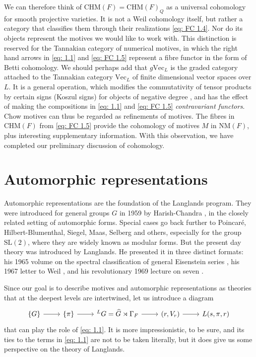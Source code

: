 \documentclass[preprint,12pt, leqno]{elsarticle}
\newcommand{\SL}{\mbox{SL}}
\newcommand{\ubf}[1]{\textit{#1}}
\numberwithin{equation}{section}
\theoremstyle{named}
\begin{document}
We can therefore think of $ \mbox{CHM}(F) = \mbox{CHM}(F)_Q$ as a universal cohomology for smooth projective varieties. It is not a Weil cohomology itself, but rather a category that classifies them through their realizations \eqref{eq: FC 1.4}. Nor do its objects represent the motives we would like to work with. This distinction is reserved for the Tannakian category of numerical motives, in which the right hand arrows in \eqref{eq: 1.1} and \eqref{eq: FC 1.5} represent a fibre functor in the form of Betti cohomology. We should perhaps add that $g\mbox{Vec}_L$ is the graded category attached to the Tannakian category $\mbox{Vec}_L$ of finite dimensional vector spaces over $L$. It is a general operation, which modifies the commutativity of tensor products by certain signs (Koszul signs) for objects of negative degree \cite[Example 2.2.2.2]{Andre1}, and has the effect of making the compositions in \eqref{eq: 1.1} and \eqref{eq: FC 1.5} \ubf{contravariant functors}. Chow motives can thus be regarded as refinements of motives. The fibres in $\mbox{CHM}(F)$ from \eqref{eq: FC 1.5} provide the cohomology of motives $M$ in $\mbox{NM}(F)$, plus interesting supplementary information. With this observation, we have completed our preliminary discussion of cohomology.

\section{Automorphic representations}\label{sec: automorphic representations}

Automorphic representations are the foundation of the Langlands program. They were introduced for general groups $G$ in 1959 by Harish-Chandra \cite{N3}, \cite{N4} in the closely related setting of automorphic forms. Special cases go back further to Poincar\'e, Hilbert-Blumenthal, Siegel, Maas, Selberg and others, especially for the group $\SL(2)$, where they are widely known as modular forms. But the present day theory was introduced by Langlands. He presented it in three distinct formats: his 1965 volume on the spectral classification of general Eisenstein series \cite{N5}, his 1967 letter to Weil \cite{N6}, and his revolutionary 1969 lecture \cite{L2} on seven .

Since our goal is to describe motives and automorphic representations as theories that at the deepest levels are intertwined, let us introduce a diagram
\begin{equation}\label{eq: 2.1}
    \begin{tikzcd}
        \{G\} \ar[r] & \{\pi\} \ar[r] & ^LG = \widehat{G}\rtimes \Gamma_{F} \ar[r] & (r, V_r) \ar[r] & L(s, \pi, r)
    \end{tikzcd}
\end{equation}
that can play the role of \eqref{eq: 1.1}. It is more impressionistic, to be sure, and its ties to the terms in \eqref{eq: 1.1} are not to be taken literally, but it does give us some perspective on the theory of Langlands.
\end{document}
